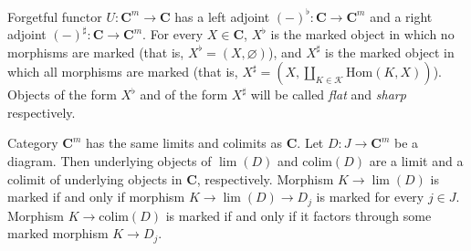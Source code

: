 \documentclass[reqno]{amsart}
\theoremstyle{definition}
\theoremstyle{remark}
\newcommand{\cat}[1]{\mathbf{#1}}
\newcommand{\C}{\cat{C}}
\newcommand{\Hom}{\mathrm{Hom}}
\newcommand{\colim}{\mathrm{colim}}
\numberwithin{figure}{section}
\begin{document}
Forgetful functor $U : \C^m \to \C$ has a left adjoint $(-)^\flat : \C \to \C^m$ and a right adjoint $(-)^\sharp : \C \to \C^m$.
For every $X \in \C$, $X^\flat$ is the marked object in which no morphisms are marked (that is, $X^\flat = (X,\varnothing)$),
and $X^\sharp$ is the marked object in which all morphisms are marked (that is, $X^\sharp = (X,\coprod_{K \in \mathcal{K}} \Hom(K,X))$).
Objects of the form $X^\flat$ and of the form $X^\sharp$ will be called \emph{flat} and \emph{sharp} respectively.

Category $\C^m$ has the same limits and colimits as $\C$.
Let $D : J \to \C^m$ be a diagram.
Then underlying objects of $\lim(D)$ and $\colim(D)$ are a limit and a colimit of underlying objects in $\C$, respectively.
Morphism $K \to \lim(D)$ is marked if and only if morphism $K \to \lim(D) \to D_j$ is marked for every $j \in J$.
Morphism $K \to \colim(D)$ is marked if and only if it factors through some marked morphism $K \to D_j$.
\end{document}
